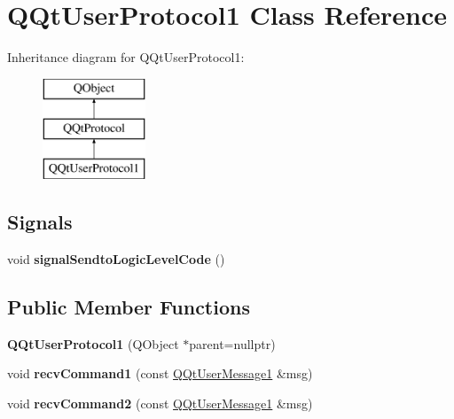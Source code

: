 \hypertarget{class_q_qt_user_protocol1}{}\section{Q\+Qt\+User\+Protocol1 Class Reference}
\label{class_q_qt_user_protocol1}
Inheritance diagram for Q\+Qt\+User\+Protocol1\+:\begin{figure}[H]
\begin{center}
\leavevmode
\includegraphics[height=3.000000cm]{class_q_qt_user_protocol1}
\end{center}
\end{figure}
\subsection*{Signals}
\begin{DoxyCompactItemize}
\item 
\mbox{\label{class_q_qt_user_protocol1_a365aee07dbb773aa5730ad06909db308}} 
void {\bfseries signal\+Sendto\+Logic\+Level\+Code} ()
\end{DoxyCompactItemize}
\subsection*{Public Member Functions}
\begin{DoxyCompactItemize}
\item 
\mbox{\label{class_q_qt_user_protocol1_afa09df3e98340761b5df929387e509fb}} 
{\bfseries Q\+Qt\+User\+Protocol1} (Q\+Object $\ast$parent=nullptr)
\item 
\mbox{\label{class_q_qt_user_protocol1_a6cc0235c6737d20f10e4ef07b4562404}} 
void {\bfseries recv\+Command1} (const \mbox{\hyperlink{class_q_qt_user_message1}{Q\+Qt\+User\+Message1}} \&msg)
\item 
\mbox{\label{class_q_qt_user_protocol1_af3173c70ed4b45e98d43003ab19f4ea1}} 
void {\bfseries recv\+Command2} (const \mbox{\hyperlink{class_q_qt_user_message1}{Q\+Qt\+User\+Message1}} \&msg)
\end{DoxyCompactItemize}
